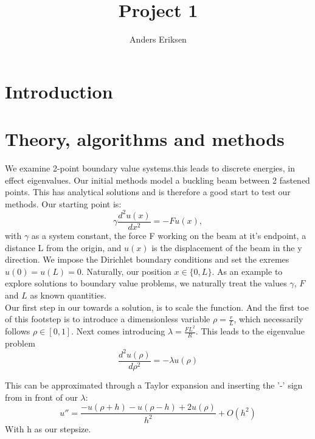 \documentclass[10pt, twocolumn]{article}
\begin{document}
\title{Project 1}
\author{Anders Eriksen}

\maketitle

\begin{abstract}

\end{abstract}

\nocite{*}

\section{Introduction}

\section{Theory, algorithms and methods}
We examine  2-point boundary value systems.this leads to discrete energies, in effect eigenvalues. 
Our initial methods model a buckling beam between 2 fastened points. This has analytical solutions 
and is therefore a good start to test our methods. Our starting point is:
\[
\gamma \frac{d^2 u(x)}{dx^2} = -F u(x),
\]
with $\gamma$ as a system constant, the force F working on the beam at it's endpoint, a distance L 
from the origin, and $u(x)$ is the displacement of the beam in the y direction. We impose the 
Dirichlet boundary conditions and set the exremes $u(0) = u(L) = 0$. Naturally, our position 
$x \in \{ 0, L \}$. As an example to explore solutions to boundary value problems, we naturally 
treat the values $\gamma$, $F$ and $L$ as known quantities. \\

Our first step in our towards a solution, is to scale the function. And the first toe of this 
footstep is to introduce a dimensionless variable $ \rho = \frac{r}{L} $, which necessarily follows 
$\rho \in [0,1]$. Next comes introducing $\lambda = \frac{FL^2}{R}$. This leads to the eigenvalue 
problem
\[
\frac{d^2u(\rho )}{d\rho^2} = -\lambda u(\rho)
\]

This can be approximated through a Taylor expansion and inserting the '-' sign from in front of our 
$\lambda$:
\[
u'' = \frac{-u(\rho + h) - u(\rho - h) + 2u(\rho)}{h^2} + {O}(h^2)
\]
With h as our stepsize.\
\end{document}
